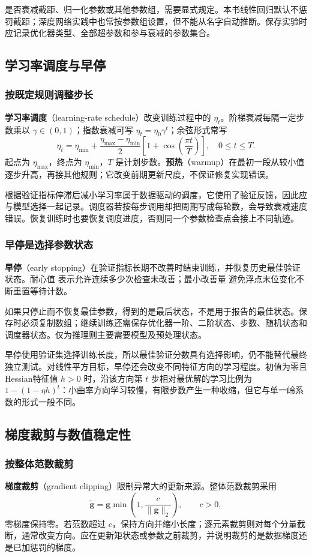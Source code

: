 \documentclass[UTF8,fontset=none,zihao=-4,a4paper]{ctexart}
\newcommand{\term}[1]{\textbf{#1}}
\newcommand{\code}[1]{\texttt{\detokenize{#1}}}
\numberwithin{equation}{section}
\numberwithin{figure}{section}
\begin{document}
是否衰减截距、归一化参数或其他参数组，需要显式规定。本书线性回归默认不惩罚截距；深度网络实践中也常按参数组设置，但不能从名字自动推断。保存实验时应记录优化器类型、全部超参数和参与衰减的参数集合。

\subsection{学习率调度与早停}
\subsubsection{按既定规则调整步长}
\term{学习率调度}（learning-rate schedule）改变训练过程中的 $\eta_t$。阶梯衰减每隔一定步数乘以 $\gamma\in(0,1)$；指数衰减可写 $\eta_t=\eta_0\gamma^t$；余弦形式常写
\[
 \eta_t=\eta_{\min}+\frac{\eta_{\max}-\eta_{\min}}2
 \left[1+\cos\left(\frac{\pi t}{T}\right)\right],\quad0\leq t\leq T.
\]
起点为 $\eta_{\max}$，终点为 $\eta_{\min}$，$T$ 是计划步数。\term{预热}（warmup）在最初一段从较小值逐步升高，再接其他规则；它改变前期更新尺度，不保证修复实现错误。

根据验证指标停滞后减小学习率属于数据驱动的调度，它使用了验证反馈，因此应与模型选择一起记录。调度器若按每步调用却把周期写成每轮数，会导致衰减速度错误。恢复训练时也要恢复调度进度，否则同一个参数检查点会接上不同轨迹。

\subsubsection{早停是选择参数状态}
\term{早停}（early stopping）在验证指标长期不改善时结束训练，并恢复历史最佳验证状态。耐心值 \code{patience} 表示允许连续多少次检查未改善；最小改善量 \code{min_delta} 避免浮点末位变化不断重置等待计数。

如果只停止而不恢复最佳参数，得到的是最后状态，不是用于报告的最佳状态。保存时必须复制数组；继续训练还需保存优化器一阶、二阶状态、步数、随机状态和调度器状态。仅为推理则主要需要模型及预处理状态。

早停使用验证集选择训练长度，所以最佳验证分数具有选择影响，仍不能替代最终独立测试。对线性平方目标，早停还会改变不同特征方向的学习程度。初值为零且Hessian特征值 $h>0$ 时，沿该方向第 $t$ 步相对最优解的学习比例为 $1-(1-\eta h)^t$：小曲率方向学习较慢，有限步数产生一种收缩，但它与单一岭系数的形式一般不同。

\subsection{梯度裁剪与数值稳定性}
\subsubsection{按整体范数裁剪}
\term{梯度裁剪}（gradient clipping）限制异常大的更新来源。整体范数裁剪采用
\[
 \widetilde{\symbf g}=\symbf g\min\left(1,\frac c{\|\symbf g\|_2}\right),\qquad c>0,
\]
零梯度保持零。若范数超过 $c$，保持方向并缩小长度；逐元素裁剪则对每个分量截断，通常改变方向。应在更新矩状态或参数之前裁剪，并说明裁剪的是数据梯度还是已加惩罚的梯度。
\end{document}
